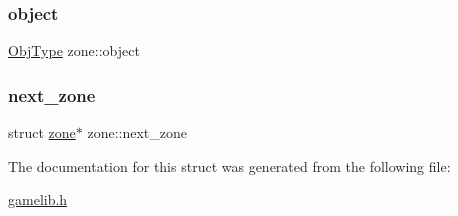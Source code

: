 \subsubsection{\texorpdfstring{object}{object}}
{\footnotesize\ttfamily \hyperlink{gamelib_8h_a21ada50c882656c2a4723dde25f56d4a}{Obj\+Type} zone\+::object}

\mbox{\label{structzone_a9b53eeb46d4127a6eee08d08a0988972}} 
\subsubsection{\texorpdfstring{next\+\_\+zone}{next\_zone}}
{\footnotesize\ttfamily struct \hyperlink{structzone}{zone}$\ast$ zone\+::next\+\_\+zone}



The documentation for this struct was generated from the following file\+:\begin{DoxyCompactItemize}
\item 
\hyperlink{gamelib_8h}{gamelib.\+h}\end{DoxyCompactItemize}
